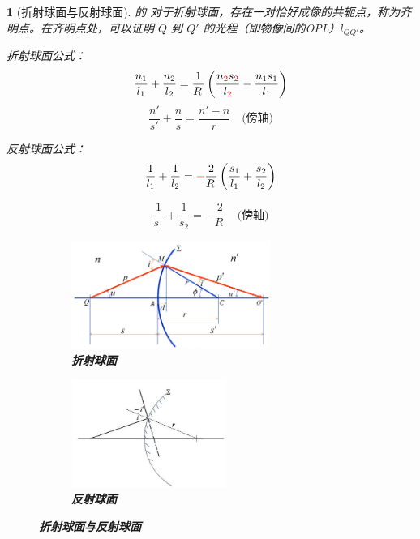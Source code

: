 \documentclass[UTF8]{report}
\theoremstyle{MyLineTheoremStyle} %
\theoremstyle{MyBlockTheoremStyle} %
\theoremstyle{MySubsubsectionStyle} %
\newtheorem{definition}{}
\begin{document}
\begin{definition}[折射球面与反射球面]
的
对于折射球面，存在一对恰好成像的共轭点，称为齐明点。在齐明点处，可以证明 $Q$ 到 $Q'$ 的光程（即物像间的OPL）$l_{QQ'}$。

折射球面公式：
\begin{gather}
\frac{n_1}{l_1} + \frac{n_2}{l_2} = \frac{1}{R\,}\left( \frac{n_{{\color{red} 2}}s_{{\color{red} 2}}}{l_{{\color{red} 2}}} - \frac{n_1s_1}{l_1} \right)
\end{gather}
{\color{gray}\small
\begin{equation}
    \frac{n'}{s'}  +  \frac{n}{s} = \frac{n'-n}{r}\quad  \text{(傍轴)}
\end{equation}
}

反射球面公式：
\begin{equation}
\frac{1}{l_1} + \frac{1}{l_2} = {\color{red} -}\frac{2}{R\,}\left(\frac{s_1}{l_1} + \frac{s_2}{l_2}  \right)
\end{equation}
{\par\color{gray}\small
\begin{equation}
 \frac{1}{s_1} + \frac{1}{s_2} = -\frac{2}{R\,} \quad  \text{(傍轴)}
\end{equation}
\par}

\begin{figure}[H]\centering
\begin{subfigure}[t]{0.45\textwidth}\centering
    \includegraphics[height=100pt]{assets/1,2/image.jpg}
    \caption{\bfseries 折射球面 }
\end{subfigure}\begin{subfigure}[t]{0.4\textwidth}\centering
    \includegraphics[height=100pt]{assets/1,2/image (1).jpg}
    \caption{\bfseries 反射球面 }
\end{subfigure}
\caption{\bfseries 折射球面与反射球面 }
\end{figure}

\end{definition}
\end{document}
